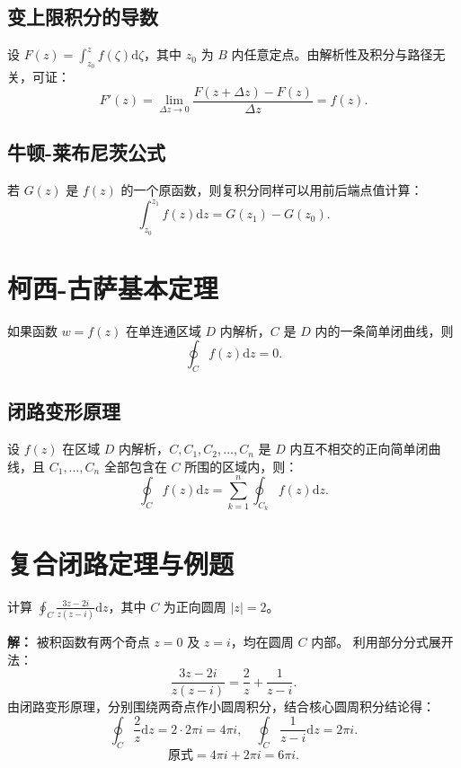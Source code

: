 \subsection{变上限积分的导数}
设 $F(z) = \int_{z_0}^z f(\zeta) \mathrm{d}\zeta$，其中 $z_0$ 为 $B$ 内任意定点。由解析性及积分与路径无关，可证：
\[
F'(z) = \lim_{\Delta z \to 0} \frac{F(z+\Delta z) - F(z)}{\Delta z} = f(z).
\]

\subsection{牛顿-莱布尼茨公式}
若 $G(z)$ 是 $f(z)$ 的一个原函数，则复积分同样可以用前后端点值计算：
\[
\int_{z_0}^{z_1} f(z) \mathrm{d}z = G(z_1) - G(z_0).
\]

\section{柯西-古萨基本定理}

\begin{tcolorbox}[title=定理：柯西-古萨定理 (Cauchy-Goursat Theorem), colframe=green!45!black, colback=green!5!white]
	如果函数 $w=f(z)$ 在单连通区域 $D$ 内解析，$C$ 是 $D$ 内的一条简单闭曲线，则
	\[
	\oint_C f(z) \mathrm{d}z = 0.
	\]
\end{tcolorbox}

\subsection{闭路变形原理}
\begin{tcolorbox}[colframe=teal!60!black, colback=teal!5!white, leftrule=3pt, rightrule=0pt, toprule=0pt, bottomrule=0pt, sharp corners]
	设 $f(z)$ 在区域 $D$ 内解析，$C, C_1, C_2, \dots, C_n$ 是 $D$ 内互不相交的正向简单闭曲线，且 $C_1, \dots, C_n$ 全部包含在 $C$ 所围的区域内，则：
	\[
	\oint_C f(z) \mathrm{d}z = \sum_{k=1}^n \oint_{C_k} f(z) \mathrm{d}z.
	\]
\end{tcolorbox}

\section{复合闭路定理与例题}

\begin{tcolorbox}[title=例 3, colframe=orange!75!black, colback=orange!5!white, sharp corners]
	计算 $\displaystyle \oint_C \frac{3z-2i}{z(z-i)} \mathrm{d}z$，其中 $C$ 为正向圆周 $|z|=2$。
	
	\tcbline
	
	\textbf{解：} 被积函数有两个奇点 $z=0$ 及 $z=i$，均在圆周 $C$ 内部。
	利用部分分式展开法：
	\[
	\frac{3z-2i}{z(z-i)} = \frac{2}{z} + \frac{1}{z-i}.
	\]
	由闭路变形原理，分别围绕两奇点作小圆周积分，结合核心圆周积分结论得：
	\[
	\oint_C \frac{2}{z} \mathrm{d}z = 2 \cdot 2\pi i = 4\pi i, \quad \oint_C \frac{1}{z-i} \mathrm{d}z = 2\pi i.
	\]
	\[
	\text{原式} = 4\pi i + 2\pi i = 6\pi i.
	\]
\end{tcolorbox}

